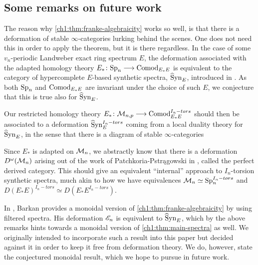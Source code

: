 



\subsection*{Some remarks on future work}

The reason why \cref{ch1:thm:franke-algebraicity} works so well, is that there is a deformation of stable $\infty$-categories lurking behind the scenes. One does not need this in order to apply the theorem, but it is there regardless. In the case of some $v_n$-periodic Landweber exact ring spectrum $E$, the deformation associated with the adapted homology theory $E_*\colon \mathrm{Sp}_{n} \longrightarrow \mathrm{Comod}_{E_*E}$ is equivalent to the category of hypercomplete $E$-based synthetic spectra, $\widehat{\mathrm{S}}\mathrm{yn}_{E}$, introduced in \cite{pstragowski_2022}. As both $\mathrm{Sp}_{n}$ and $\mathrm{Comod}_{E_*E}$ are invariant under the choice of such $E$, we conjecture that this is true also for $\widehat{\mathrm{S}}\mathrm{yn}_{E}$. 

Our restricted homology theory $E_*\colon \mathcal{M}_{n,p}\longrightarrow \mathrm{Comod}_{E_*E}^{I_n-tors}$ should then be associated to a deformation $\widehat{\mathrm{S}}\mathrm{yn}_{E}^{I_n-tors}$ coming from a local duality theory for $\widehat{\mathrm{S}}\mathrm{yn}_{E}$, in the sense that there is a diagram of stable $\infty$-categories 
\begin{center}
\end{center}
Since $E_*$ is adapted on $\mathcal{M}_{n}$, we abstractly know that there is a deformation $D^\omega(\mathcal{M}_{n})$ arising out of the work of Patchkoria-Pstr{\k a}gowski in \cite{patchkoria-pstragowski_2021}, called the perfect derived category. This should give an equivalent ``internal'' approach to $I_n$-torsion synthetic spectra, much akin to how we have equivalences $\mathcal{M}_{n}\simeq \mathrm{Sp}_{n}^{I_n-tors}$ and $D(E_*E)^{I_n-tors}\simeq D(E_*E^{I_n-tors})$. 

In \cite{barkan_2023}, Barkan provides a monoidal version of \cref{ch1:thm:franke-algebraicity} by using filtered spectra. His deformation $\mathscr{E}_{n}$ is equivalent to $\widehat{\mathrm{S}}\mathrm{yn}_{E}$, which by the above remarks hints towards a monoidal version of \cref{ch1:thm:main-spectra} as well. We originally intended to incorporate such a result into this paper but decided against it in order to keep it free from deformation theory. We do, however, state the conjectured monoidal result, which we hope to pursue in future work.

